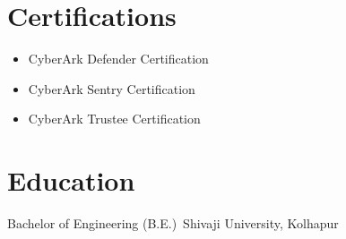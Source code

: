 \documentclass[a4paper,11pt]{article}
\begin{document}
\vspace{2pt}
\section{Certifications}
\vspace{2pt}
\begin{itemize}
\item CyberArk Defender Certification
\item CyberArk Sentry Certification
\item CyberArk Trustee Certification
\end{itemize}


\section{Education}
\vspace{2pt}
Bachelor of Engineering (B.E.)\
Shivaji University, Kolhapur
\end{document}

